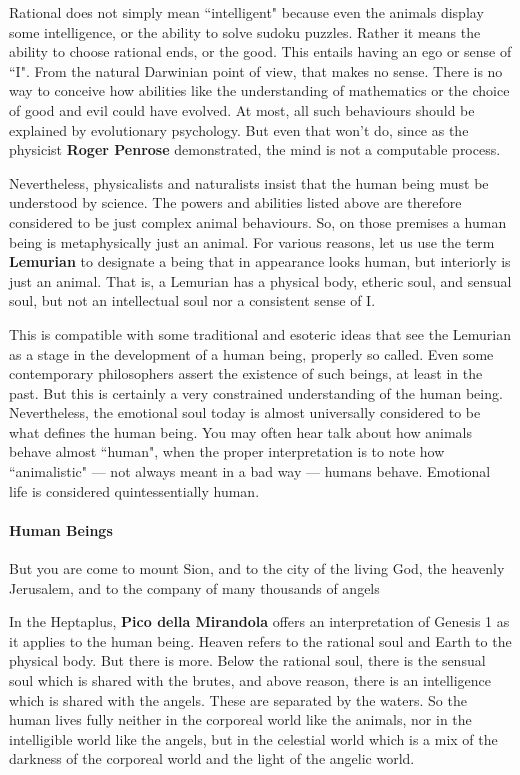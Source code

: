 Rational does not simply mean ``intelligent" because even the animals display some intelligence, or the ability to solve sudoku puzzles. Rather it means the ability to choose rational ends, or the good. This entails having an ego or sense of ``I". From the natural Darwinian point of view, that makes no sense. There is no way to conceive how abilities like the understanding of mathematics or the choice of good and evil could have evolved. At most, all such behaviours should be explained by evolutionary psychology. But even that won't do, since as the physicist \textbf{Roger Penrose} demonstrated, the mind is not a computable process.

Nevertheless, physicalists and naturalists insist that the human being must be understood by science. The powers and abilities listed above are therefore considered to be just complex animal behaviours. So, on those premises a human being is metaphysically just an animal. For various reasons, let us use the term \textbf{Lemurian} to designate a being that in appearance looks human, but interiorly is just an animal. That is, a Lemurian has a physical body, etheric soul, and sensual soul, but not an intellectual soul nor a consistent sense of I.

This is compatible with some traditional and esoteric ideas that see the Lemurian as a stage in the development of a human being, properly so called. Even some contemporary philosophers assert the existence of such beings, at least in the past. But this is certainly a very constrained understanding of the human being. Nevertheless, the emotional soul today is almost universally considered to be what defines the human being. You may often hear talk about how animals behave almost ``human", when the proper interpretation is to note how ``animalistic" — not always meant in a bad way — humans behave. Emotional life is considered quintessentially human.

\paragraph{Human Beings}
\begin{quotex}
But you are come to mount Sion, and to the city of the living God, the heavenly Jerusalem, and to the company of many thousands of angels 

\end{quotex}
In the Heptaplus, \textbf{Pico della Mirandola} offers an interpretation of Genesis 1 as it applies to the human being. Heaven refers to the rational soul and Earth to the physical body. But there is more. Below the rational soul, there is the sensual soul which is shared with the brutes, and above reason, there is an intelligence which is shared with the angels. These are separated by the waters. So the human lives fully neither in the corporeal world like the animals, nor in the intelligible world like the angels, but in the celestial world which is a mix of the darkness of the corporeal world and the light of the angelic world.


